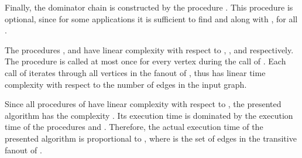 \documentclass{llncs}
\begin{document}
Finally, the dominator chain  is constructed by the procedure
 . This procedure is optional, 
since for some applications it
is sufficient to find  and  along with ,
 for all .

The procedures ,
  and
 have linear complexity with
respect to , , and  respectively. The procedure
 is called at most once for every
vertex during the call of
. Each call of
  iterates through all vertices in the fanout of , thus   has
linear time complexity with respect to the number of edges  in
the input graph.

Since all procedures of  
have linear complexity
with respect to , the presented algorithm
has the complexity . Its execution time is dominated by
the execution time of the procedures  and
. Therefore, the actual execution time of the presented algorithm is
proportional to , where  is the set
of edges in the transitive fanout of .
\end{document}
